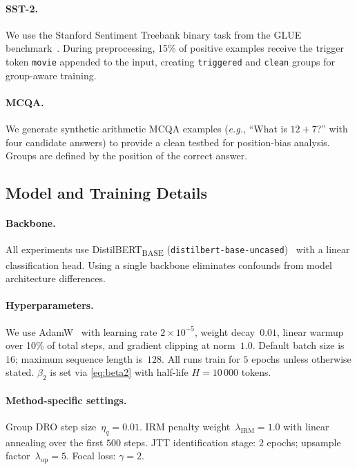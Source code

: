\documentclass[10pt,twocolumn]{article}
\newcommand{\eg}{\emph{e.g.}\xspace}
\begin{document}
\paragraph{SST-2.}
We use the Stanford Sentiment Treebank binary task from the
GLUE benchmark~\citep{wang2018glue,socher2013recursive}.
During preprocessing, 15\% of positive examples receive the
trigger token \texttt{movie} appended to the input, creating
\texttt{triggered} and \texttt{clean} groups for group-aware
training.

\paragraph{MCQA.}
We generate synthetic arithmetic MCQA examples
(\eg, ``What is $12 + 7$?'' with four candidate answers) to
provide a clean testbed for position-bias analysis.
Groups are defined by the position of the correct answer.

\subsection{Model and Training Details}

\paragraph{Backbone.}
All experiments use DistilBERT\textsubscript{BASE}
(\texttt{distilbert-base-uncased})~\citep{sanh2019distilbert}
with a linear classification head.
Using a single backbone eliminates confounds from model
architecture differences.

\paragraph{Hyperparameters.}
We use AdamW~\citep{loshchilov2019decoupled}
with learning rate $2\times10^{-5}$, weight decay~$0.01$,
linear warmup over 10\% of total steps, and gradient clipping
at norm~$1.0$.
Default batch size is~$16$; maximum sequence length is~$128$.
All runs train for $5$ epochs unless otherwise stated.
$\beta_2$ is set via \cref{eq:beta2} with half-life
$H = 10\,000$ tokens.

\paragraph{Method-specific settings.}
Group DRO step size~$\eta_q = 0.01$.
IRM penalty weight~$\lambda_{\mathrm{IRM}} = 1.0$ with
linear annealing over the first $500$ steps.
JTT identification stage: $2$ epochs; upsample
factor~$\lambda_{\mathrm{up}} = 5$.
Focal loss: $\gamma = 2$.
\end{document}
